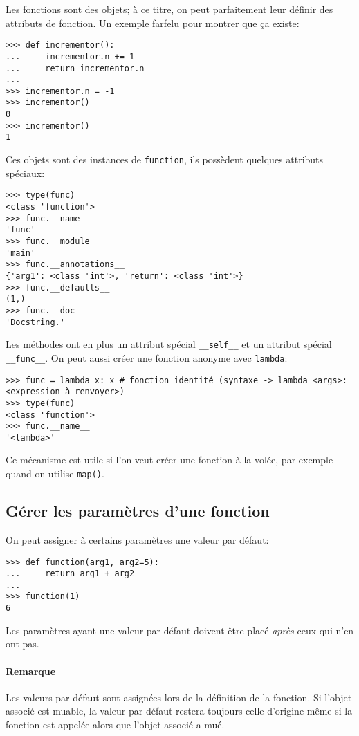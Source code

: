 Les fonctions sont des objets; à ce titre, on peut parfaitement leur définir des attributs de fonction. Un exemple farfelu
pour montrer que ça existe:

\begin{verbatim}
>>> def incrementor():
...     incrementor.n += 1
...     return incrementor.n
...
>>> incrementor.n = -1
>>> incrementor()
0
>>> incrementor()
1
\end{verbatim}

Ces objets sont des instances de \texttt{function}, ils possèdent quelques attributs spéciaux:

\begin{verbatim}
>>> type(func)
<class 'function'>
>>> func.__name__
'func'
>>> func.__module__
'main'
>>> func.__annotations__
{'arg1': <class 'int'>, 'return': <class 'int'>}
>>> func.__defaults__
(1,)
>>> func.__doc__
'Docstring.'
\end{verbatim}

Les méthodes ont en plus un attribut spécial \texttt{__self__} et un attribut spécial \texttt{__func__}. On peut aussi créer une fonction anonyme avec \texttt{lambda}:

\begin{verbatim}
>>> func = lambda x: x # fonction identité (syntaxe -> lambda <args>: <expression à renvoyer>)
>>> type(func)
<class 'function'>
>>> func.__name__
'<lambda>'
\end{verbatim}

Ce mécanisme est utile si l'on veut créer une fonction à la volée, par exemple quand on utilise \texttt{map()}.

\subsection{Gérer les paramètres d'une fonction}

On peut assigner à certains paramètres une valeur par défaut:

\begin{verbatim}
>>> def function(arg1, arg2=5):
...     return arg1 + arg2
... 
>>> function(1)
6
\end{verbatim}

Les paramètres ayant une valeur par défaut doivent être placé \emph{après} ceux qui n'en ont pas.

\paragraph*{Remarque} Les valeurs par défaut sont assignées lors de la définition de la fonction. Si l'objet associé est
muable, la valeur par défaut restera toujours celle d'origine même si la fonction est appelée alors que l'objet associé
a mué.\medskip

